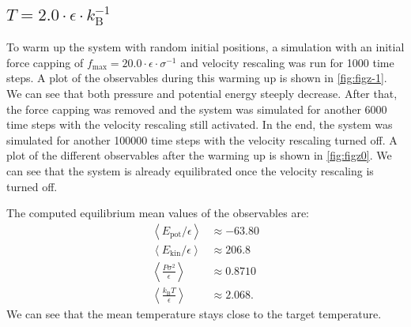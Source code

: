 \documentclass[a4paper,10pt,bibtotoc]{scrartcl}
\begin{document}
\newpage
\subsection{$T = 2.0\cdot \epsilon\cdot k_\mathrm{B}^{-1}$}
To warm up the system with random initial positions, a simulation with an initial force capping of $f_\mathrm{max} = 20.0\cdot\epsilon\cdot \sigma^{-1}$ and velocity rescaling was run for 1000 time steps.
A plot of the observables during this warming up is shown in \autoref{fig:figz-1}.
We can see that both pressure and potential energy steeply decrease.
After that, the force capping was removed and the system was simulated for another 6000 time steps with the velocity rescaling still activated. 
In the end, the system was simulated for another 100000 time steps with the velocity rescaling turned off.
A plot of the different observables after the warming up is shown in \autoref{fig:figz0}.
We can see that the system is already equilibrated once the velocity rescaling is turned off. 

The computed equilibrium mean values of the observables are:
\begin{align*}
\left\langle E_\mathrm{pot}/\epsilon \right\rangle &\approx-63.80\\
\left\langle E_\mathrm{kin}/\epsilon\right\rangle &\approx 206.8\\
\left\langle \frac{P\sigma ^2}{\epsilon}\right\rangle &\approx0.8710\\
\left\langle \frac{k_\mathrm{B}T}{\epsilon}\right\rangle &\approx2.068.
\end{align*}
We can see that the mean temperature stays close to the target temperature.
\end{document}
